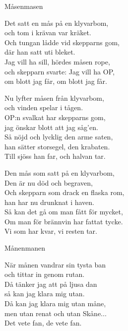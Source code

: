 \newpage

\begin{song}{Måsen}{masen}
\begin{vers}
Det satt en mås på en klyvarbom,\\
och tom i krävan var kräket.\\
Och tungan lådde vid skepparns gom,\\
där han satt uti bleket.\\
Jag vill ha sill, hördes måsen rope,\\
och skepparn svarte: Jag vill ha OP,\\
om blott jag får, om blott jag får.\\
\end{vers}

\begin{vers}
Nu lyfter måsen från klyvarbom,\\
och vinden spelar i tågen.\\
OP:n svalkat har skepparns gom,\\
jag önskar blott att jag såg'en.\\
Så nöjd och lycklig den arme saten,\\
han sätter storsegel, den krabaten.\\
Till sjöss han far, och halvan tar.\\
\end{vers}

\begin{vers}
Den mås som satt på en klyvarbom,\\
Den är nu död och begraven,\\
Och skepparn som drack en flaska rom,\\
han har nu drunknat i haven.\\
Så kan det gå om man fått för mycket,\\
Om man för brännvin har fattat tycke.\\
Vi som har kvar, vi resten tar.\\
\end{vers}
\end{song}

\newpage

\begin{song}{Månen}{manen}
\begin{vers}
När månen vandrar sin tysta ban\\
och tittar in genom rutan.\\
Då tänker jag att på ljusa dan\\
så kan jag klara mig utan.\\
Då kan jag klara mig utan måne,\\
men utan renat och utan Skåne...\\
Det vete fan, de vete fan.\\
\end{vers}
\end{song}


